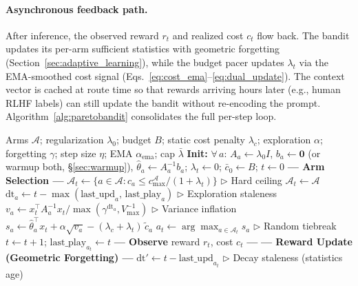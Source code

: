 \paragraph{Asynchronous feedback path.}
After inference, the observed reward $r_t$ and realized cost $c_t$ flow back. The bandit updates its per-arm sufficient statistics with geometric forgetting (Section~\ref{sec:adaptive_learning}), while the budget pacer updates $\lambda_t$ via the EMA-smoothed cost signal (Eqs.~\ref{eq:cost_ema}--\ref{eq:dual_update}). The context vector is cached at route time so that rewards arriving hours later (e.g., human RLHF labels) can still update the bandit without re-encoding the prompt. Algorithm~\ref{alg:paretobandit} consolidates the full per-step loop.

\begin{algorithm}[ht]
\caption{ParetoBandit: Budget-Paced Non-Stationary Routing}
\label{alg:paretobandit}
\begin{algorithmic}[1]
\REQUIRE Arms $\mathcal{A}$; regularization $\lambda_0$; budget $B$; static cost penalty $\lambda_c$; exploration $\alpha$; forgetting $\gamma$; step size $\eta$; EMA $\alpha_{\mathrm{ema}}$; cap $\bar\lambda$
\STATE \textbf{Init:} $\forall\, a$: $A_a \!\leftarrow\! \lambda_0 I$, $b_a \!\leftarrow\! \mathbf{0}$ (or warmup both, \S\ref{sec:warmup}), $\hat\theta_a \!\leftarrow\! A_a^{-1} b_a$; $\lambda_t \!\leftarrow\! 0$; $\bar{c}_0 \!\leftarrow\! B$; $t \!\leftarrow\! 0$
\STATE \textbf{--- Arm Selection ---}
\STATE $\mathcal{A}_t \leftarrow \{a \in \mathcal{A} : c_a \leq c_{\max}^{\mathcal{A}} / (1 {+} \lambda_t)\}$ \label{line:ceiling} \hfill $\triangleright$ Hard ceiling
\ELSE
\STATE $\mathcal{A}_t \leftarrow \mathcal{A}$
\ENDIF
{}
\STATE $\mathrm{dt}_a \leftarrow t - \max(\text{last\_upd}_a,\, \text{last\_play}_a)$ \hfill $\triangleright$ Exploration staleness
\STATE $v_a \leftarrow x_t^\top A_a^{-1} x_t / \max(\gamma^{\mathrm{dt}_a}, V_{\max}^{-1})$ \hfill $\triangleright$ Variance inflation
\STATE $s_a \leftarrow \hat\theta_a^\top x_t + \alpha\sqrt{v_a} - (\lambda_c + \lambda_t)\,\tilde{c}_a$ \label{line:ucb}
\ENDFOR
\STATE $a_t \leftarrow \arg\max_{a \in \mathcal{A}_t} s_a$ \hfill $\triangleright$ Random tiebreak
\STATE $t \leftarrow t + 1$;\; $\text{last\_play}_{a_t} \leftarrow t$
\STATE \textbf{--- Observe} reward $r_t$, cost $c_t$ \textbf{---}
\STATE \textbf{--- Reward Update (Geometric Forgetting) ---}
\STATE $\mathrm{dt}' \leftarrow t - \text{last\_upd}_{a_t}$ \hfill $\triangleright$ Decay staleness (statistics age)

\end{algorithmic}
\end{algorithm}
